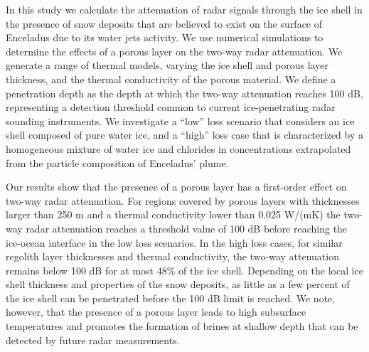 \documentclass[11pt]{article}
\begin{document}
In this study we calculate the attenuation of radar signals through the ice shell in the presence of snow deposits that are believed to exist on the surface of Enceladus due to its water jets activity. We use numerical simulations to determine the effects of a porous layer on the two-way radar attenuation. We generate a range of thermal models, varying the ice shell and porous layer thickness, and the thermal conductivity of the porous material. We define a penetration depth as the depth at which the two-way attenuation reaches 100 dB, representing a detection threshold common to current ice-penetrating radar sounding instruments. We investigate a “low” loss scenario that considers an ice shell composed of pure water ice, and a “high” loss case that is characterized by a homogeneous mixture of water ice and chlorides in concentrations extrapolated from the particle composition of Enceladus’ plume.

Our results show that the presence of a porous layer has a first-order effect on two-way radar attenuation. For regions covered by porous layers with thicknesses larger than 250 m and a thermal conductivity lower than 0.025 W/(mK) the two-way radar attenuation reaches a threshold value of 100 dB before reaching the ice-ocean interface in the low loss scenarios. In the high loss cases, for similar regolith layer thicknesses and thermal conductivity, the two-way attenuation remains below 100 dB for at most 48\% of the ice shell. Depending on the local ice shell thickness and properties of the snow deposits, as little as a few percent of the ice shell can be penetrated before the 100 dB limit is reached. We note, however, that the presence of a porous layer leads to high subsurface temperatures and promotes the formation of brines at shallow depth that can be detected by future radar measurements.
\end{document}
